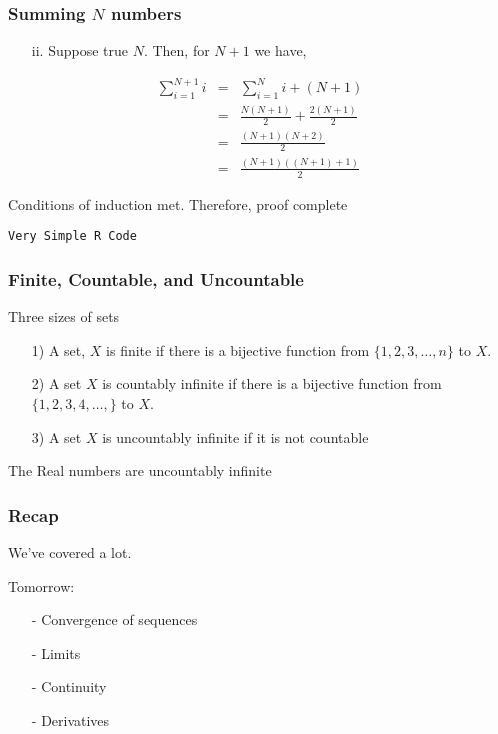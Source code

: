 \documentclass{beamer}
\numberwithin{equation}{section}
\begin{document}
\begin{frame}
\frametitle{Summing $N$ numbers}
\begin{itemize}
\item[ii.] Suppose true $N$.  Then, for $N+1$ we have,
\end{itemize}
\begin{eqnarray}
\sum_{i=1}^{N+1} i & = & \sum_{i=1}^{N} i  + (N + 1) \nonumber \\
							& = & \frac{N(N + 1)}{2}  + \frac{ 2 (N + 1)}{2} \nonumber \\
							& = & \frac{(N + 1)( N + 2) }{2} \nonumber \\
							& = & \frac{ (N + 1)( (N + 1) + 1)}{2} \nonumber
\end{eqnarray}

Conditions of induction met.  Therefore, proof complete

\end{frame}


\begin{frame}


{\tt Very Simple R Code}


\end{frame}


\begin{frame}
\frametitle{Finite, Countable, and Uncountable}
Three sizes of sets
\begin{itemize}
\item[1)] A set, $X$ is finite if there is a bijective function from $\{1, 2, 3, \hdots, n\}$ to $X$.
\item[2)] A set $X$ is \alert{countably infinite} if there is a bijective function from $\{1, 2, 3, 4, \hdots, \}$ to $X$.
\item[3)] A set $X$ is \alert{uncountably infinite} if it is not countable
\end{itemize}

The \alert{Real numbers} are \alert{uncountably infinite}


\end{frame}

\begin{frame}
\frametitle{Recap}
\alert{We've covered a lot}.\pause \\
 \pause
\begin{itemize}
 \pause
{} \pause
{}
\end{itemize}







\end{frame}




\begin{frame}

Tomorrow:
\begin{itemize}
\item[-] Convergence of sequences
\item[-] Limits
\item[-] Continuity
\item[-] Derivatives
\end{itemize}
\end{frame}
\end{document}
